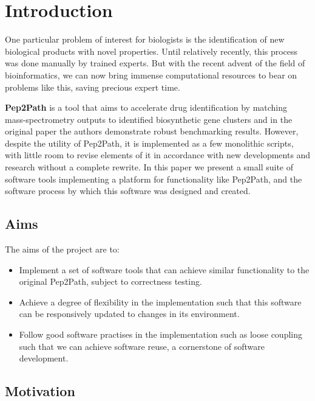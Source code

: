 \documentclass{l4proj}
\newcommand{\cit}[1]{\citep{#1}}
\begin{document}
\chapter{Introduction}


One particular problem of interest for biologists is the identification of new biological products with novel properties. Until relatively recently, this process was done manually by trained experts. But with the recent advent of the field of bioinformatics, we can now bring immense computational resources to bear on problems like this, saving precious expert time.

\textbf{Pep2Path} \cit{p2p} is a tool that aims to accelerate drug identification by matching mass-spectrometry outputs to identified biosynthetic gene clusters and in the original paper the authors demonstrate robust benchmarking results. However, despite the utility of Pep2Path, it is implemented as a few monolithic scripts, with little room to revise elements of it in accordance with new developments and research without a complete rewrite. In this paper we present a small suite of software tools implementing a platform for functionality like Pep2Path, and the software process by which this software was designed and created.

\section{Aims}

The aims of the project are to:

\begin{itemize}
\item Implement a set of software tools that can achieve similar functionality to the original Pep2Path, subject to correctness testing.
\item Achieve a degree of flexibility in the implementation such that this software can be responsively updated to changes in its environment.
\item Follow good software practises in the implementation such as loose coupling such that we can achieve software reuse, a cornerstone of software development.
\end{itemize}

\section{Motivation} \label{motivation}
\end{document}
